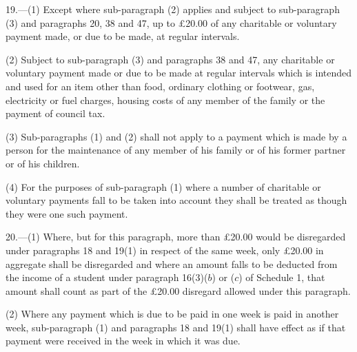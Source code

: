 \documentclass[12pt,a4paper]{article}
\begin{document}
\medskip

19.—(1) Except where sub-paragraph (2) applies and subject to sub-\hspace{0pt}paragraph (3) and paragraphs 20, 38 and 47, 
up to £20.00  %
of any charitable or voluntary payment made, or due to be made, at regular intervals.

(2) Subject to sub-paragraph (3) and paragraphs 38 and 47, any charitable or voluntary payment made or due to be made at regular intervals which is intended and used for an item other than food, ordinary clothing or footwear, gas, electricity or fuel charges, housing costs of any member of the family or the payment of council tax.

(3) Sub-paragraphs (1) and (2) shall not apply to a payment which is made by a person for the maintenance of any member of his family or of his former partner or of his children.

(4) For the purposes of sub-paragraph (1) where a number of charitable or voluntary payments fall to be taken into account they shall be treated as though they were one such payment.


\medskip

20.—(1) Where, but for this paragraph, more than 
£20.00  %
would be disregarded under paragraphs 18 and 19(1) in respect of the same week, only 
£20.00  %
in aggregate shall be disregarded and where an amount falls to be deducted from the income of a student under paragraph 16(3)($b$) or ($c$) of Schedule 1, that amount shall count as part of the 
£20.00  %
disregard allowed under this paragraph.

(2) Where any payment which is due to be paid in one week is paid in another week, sub-paragraph (1) and paragraphs 18 and 19(1) shall have effect as if that payment were received in the week in which it was due.

\end{document}
